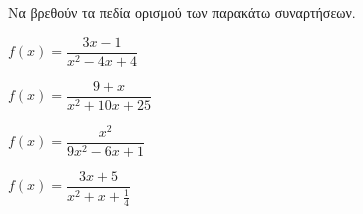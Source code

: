Να βρεθούν τα πεδία ορισμού των παρακάτω συναρτήσεων.
\begin{alist}
\item $ f(x)=\dfrac{3x-1}{x^2-4x+4} $
\item $ f(x)=\dfrac{9+x}{x^2+10x+25} $
\item $ f(x)=\dfrac{x^2}{9x^2-6x+1} $
\item $ f(x)=\dfrac{3x+5}{x^2+x+\frac{1}{4}} $
\end{alist}
